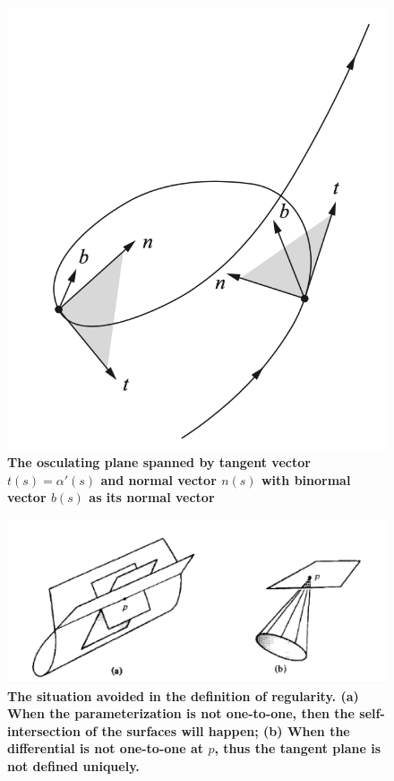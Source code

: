 \documentclass[11pt]{article}
\begin{document}
\begin{itemize}
\begin{figure}[tb]
\begin{minipage}{1\linewidth}
 \centerline{\includegraphics[scale = 0.6]{osculating_plane.png}}
\end{minipage}
\caption{\scriptsize\textbf{The osculating plane spanned by tangent vector $t(s) = \alpha'(s)$ and normal vector $n(s)$ with binormal vector $b(s)$ as its normal vector \citep{do1976differential}}}
\label{fig: osculating_plane}
\end{figure}

\begin{figure}[htb]
\centering
\begin{minipage}{0.6\linewidth}
 \centerline{\includegraphics[scale = 0.5]{regular_surface.png}}
\end{minipage}
\caption{\scriptsize{\textbf{The situation avoided in the definition of regularity. (a) When the parameterization is not one-to-one, then the self-intersection of the surfaces will happen;   (b) When the differential is not one-to-one at $p$, thus the tangent plane is not defined uniquely. }}}
\label{fig: regular_surface}
\end{figure}


\end{itemize}
\end{document}
